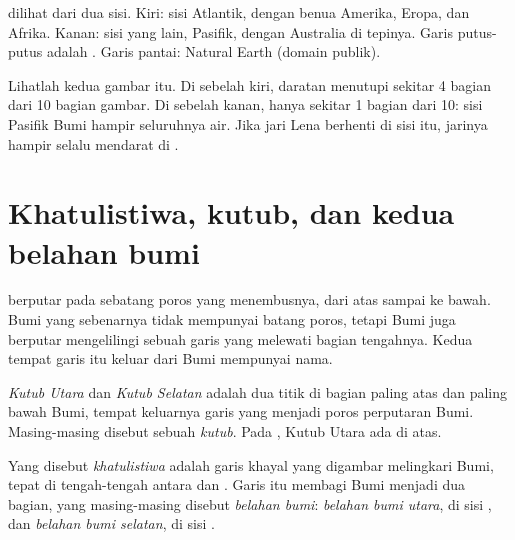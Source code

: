 \begin{omfigure}
{\small {} dilihat dari dua sisi. Kiri: sisi  Atlantik,
dengan benua Amerika, Eropa, dan Afrika. Kanan: sisi yang lain, 
Pasifik, dengan Australia di tepinya. Garis putus-putus adalah
. Garis pantai: Natural Earth (domain publik).}
\label{fig:g3:continents-and-oceans:globes}
\end{omfigure}

\begin{remark}\label{rem:g3:continents-and-oceans:halves}
Lihatlah kedua gambar itu. Di sebelah kiri, daratan menutupi sekitar 4
bagian dari 10 bagian gambar. Di sebelah kanan, hanya sekitar 1 bagian
dari 10: sisi Pasifik Bumi hampir seluruhnya air. Jika jari Lena berhenti
di sisi  itu, jarinya hampir selalu mendarat di .
\end{remark}

\section{Khatulistiwa, kutub, dan kedua belahan bumi}

 berputar pada sebatang poros yang menembusnya, dari atas sampai
ke bawah. Bumi yang sebenarnya tidak mempunyai batang poros, tetapi Bumi
juga berputar mengelilingi sebuah garis yang melewati bagian tengahnya.
Kedua tempat garis itu keluar dari Bumi mempunyai nama.

\begin{definition}[Kutub]\label{def:g3:continents-and-oceans:poles}
\emph{Kutub Utara} dan \emph{Kutub
Selatan} adalah dua titik di bagian paling atas dan
paling bawah Bumi, tempat keluarnya garis yang menjadi poros perputaran
Bumi. Masing-masing disebut sebuah \emph{kutub}. Pada , Kutub Utara ada di atas.
\end{definition}

\begin{definition}\label{def:g3:continents-and-oceans:equator}
Yang disebut \emph{khatulistiwa} adalah garis khayal
yang digambar melingkari Bumi, tepat di tengah-tengah antara 
dan . Garis itu membagi Bumi menjadi dua bagian, yang
masing-masing disebut \emph{belahan bumi}:
\emph{belahan bumi utara}, di sisi ,
dan \emph{belahan bumi selatan}, di sisi .
\end{definition}

